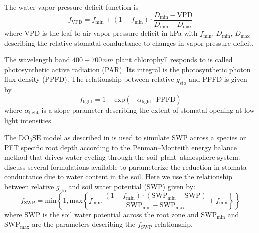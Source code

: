 \documentclass[bg, manuscript]{copernicus}
\begin{document}
The water vapor pressure deficit function is
%
\begin{equation}
  f_\mathrm{VPD} = f_\text{min}+(1-f_\text{min}) \cdot \frac{D_\text{min} - \text{VPD}}{D_\text{min}-D_\text{max}}
  \label{eq:f_vpd}
\end{equation}
%
where VPD is the leaf to air vapor pressure deficit in \unit{kPa} with $f_\text{min}$, $D_\text{min}$, $D_\text{max}$ describing the relative stomatal conductance to changes in vapor pressure deficit.

The wavelength band $400-700\,\unit{nm}$ plant chlorophyll responds to is called photosynthetic active radiation (PAR). Its integral is the photosynthetic photon flux density (PPFD). The relationship between relative $g_\mathrm{sto}$ and PPFD is given by
%
\begin{equation}
  f_\text{light} = 1-\text{exp}(-\alpha_\text{light}\cdot \text{PPFD})
  \label{eq:flight}
\end{equation}
%
where $\alpha_\mathrm{light}$ is a slope parameter describing the extent of stomatal opening at low light intensities.

The $\mathrm{DO_3SE}$ model as described in \citet{ACP:Bueker2012} is used to simulate SWP across a species or PFT specific root depth according to the Penman--Monteith energy balance method that drives water cycling through the soil--plant--atmosphere system. \citet{ACP:Bueker2012} discuss several formulations available to parameterize the reduction in stomata conductance due to water content in the soil. Here we use the relationship between relative $g_\mathrm{sto}$ and soil water potential (SWP) given by:
%
\begin{equation}
  f_\mathrm{SWP} = \text{min}\left\{1, \text{max}\left\{f_\mathrm{min}, \frac{(1 - f_\mathrm{min})\cdot(\mathrm{SWP_{min}} - \mathrm{SWP})}{\mathrm{SWP_{min}} - \mathrm{SWP_{max}}} + f_\mathrm{min} \right\} \right\}
    \label{eq:fsw}
\end{equation}
%
where SWP is the soil water potential across the root zone and $\mathrm{SWP_{min}}$ and $\mathrm{SWP_{max}}$ are the parameters describing the $f_\mathrm{SWP}$ relationship.
\end{document}
